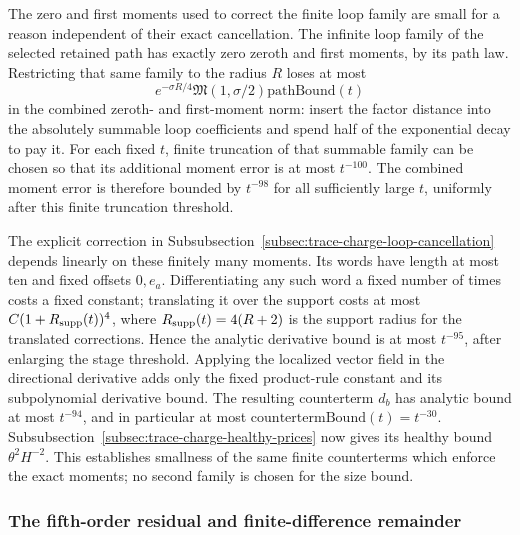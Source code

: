 The zero and first moments used to correct the finite loop family are
small for a reason independent of their exact cancellation. The infinite loop family of the selected retained path has exactly
zero zeroth and first moments, by its path law. Restricting that same
family to the radius $R$ loses at most
\[
 e^{-\sigma R/4}\mathfrak M(1,\sigma/2)
                \mathrm{pathBound}(t)
\]
in the combined zeroth- and first-moment norm: insert the factor distance
into the absolutely
summable loop coefficients and spend half of the exponential decay to
pay it. For each fixed $t$, finite truncation of that summable family
can be chosen so that its additional moment error is at most
$t^{-100}$. The combined moment error is therefore bounded by
$t^{-98}$ for all sufficiently large $t$, uniformly after this finite
truncation threshold.

The explicit correction in
Subsubsection~\ref{subsec:trace-charge-loop-cancellation} depends linearly on
these finitely many moments. Its words have length at most ten and
fixed offsets $0,e_a$. Differentiating any such word a fixed number of
times costs a fixed constant; translating it over the support costs at
most $C(1+R_{\rm supp}(t))^4$, where $R_{\rm supp}(t)=4(R+2)$
is the support radius for the translated corrections. Hence the analytic derivative bound is
at most $t^{-95}$, after enlarging the stage threshold. Applying the
localized vector field in the directional derivative adds only the
fixed product-rule constant and its subpolynomial derivative bound.
The resulting counterterm $d_b$ has analytic bound at most $t^{-94}$,
and in particular at most $\mathrm{countertermBound}(t)=t^{-30}$.
Subsubsection~\ref{subsec:trace-charge-healthy-prices} now gives its healthy
bound $\theta^2H^{-2}$. This establishes smallness of the same finite
counterterms which enforce the exact moments; no second family is
chosen for the size bound.

\subsubsection{The fifth-order residual and finite-difference remainder}
\label{subsec:trace-charge-taylor-remainders}


